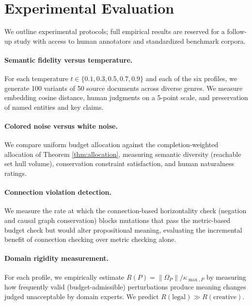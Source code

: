 \documentclass[12pt, a4paper]{article}
\theoremstyle{plain}
\theoremstyle{definition}
\theoremstyle{remark}
\newcommand{\norm}[1]{\left\lVert #1 \right\rVert}
\newcommand{\curv}{\Omega}
\begin{document}
\section{Experimental Evaluation}
\label{sec:experiments}

We outline experimental protocols; full empirical results are reserved for a
follow-up study with access to human annotators and standardized benchmark corpora.

\paragraph{Semantic fidelity versus temperature.}
For each temperature $t \in \{0.1, 0.3, 0.5, 0.7, 0.9\}$ and each of the six
profiles, we generate 100 variants of 50 source documents across diverse genres.
We measure embedding cosine distance, human judgments on a 5-point scale, and
preservation of named entities and key claims.

\paragraph{Colored noise versus white noise.}
We compare uniform budget allocation against the completion-weighted allocation
of Theorem \ref{thm:allocation}, measuring semantic diversity (reachable set
hull volume), conservation constraint satisfaction, and human naturalness ratings.

\paragraph{Connection violation detection.}
We measure the rate at which the connection-based horizontality check (negation
and causal graph conservation) blocks mutations that pass the metric-based budget
check but would alter propositional meaning, evaluating the incremental benefit
of connection checking over metric checking alone.

\paragraph{Domain rigidity measurement.}
For each profile, we empirically estimate $R(P) = \norm{\curv_P}/\kappa_{\max,P}$
by measuring how frequently valid (budget-admissible) perturbations produce
meaning changes judged unacceptable by domain experts.  We predict
$R(\mathrm{legal}) \gg R(\mathrm{creative})$.
\end{document}
